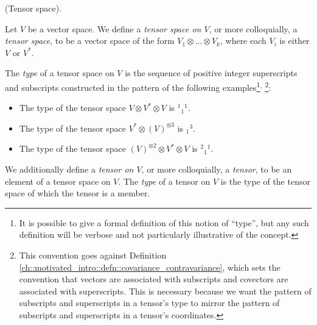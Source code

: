 \begin{defn}
    (Tensor space).
    
    Let $V$ be a vector space. We define a \textit{tensor space on $V$}, or more colloquially, a \textit{tensor space}, to be a vector space of the form $V_1 \otimes ... \otimes V_k$, where each $V_i$ is either $V$ or $V^*$.
    
    The \textit{type} of a tensor space on $V$ is the sequence of positive integer superscripts and subscripts constructed in the pattern of the following examples\footnote{It is possible to give a formal definition of this notion of ``type'', but any such definition will be verbose and not particularly illustrative of the concept.}$^{,}$ \footnote{This convention goes against Definition \ref{ch::motivated_intro::defn::covariance_contravariance}, which sets the convention that vectors are associated with subscripts and covectors are associated with superscripts. This is necessary because we want the pattern of subscripts and superscripts in a tensor's type to mirror the pattern of subscripts and superscripts in a tensor's coordinates.}:
    
    \begin{itemize}
        \item The type of the tensor space $V \otimes V^* \otimes V$ is $^1{}_1{}^1$.
        \item The type of the tensor space $V^* \otimes (V)^{\otimes 3}$ is $_1{}^3$.
        \item The type of the tensor space $(V)^{\otimes 2} \otimes V^* \otimes V$ is $^2{}_1{}^1$.
    \end{itemize}
    
    We additionally define a \textit{tensor on $V$}, or more colloquially, a \textit{tensor}, to be an element of a tensor space on $V$. The \textit{type} of a tensor on $V$ is the type of the tensor space of which the tensor is a member.
\end{defn}

